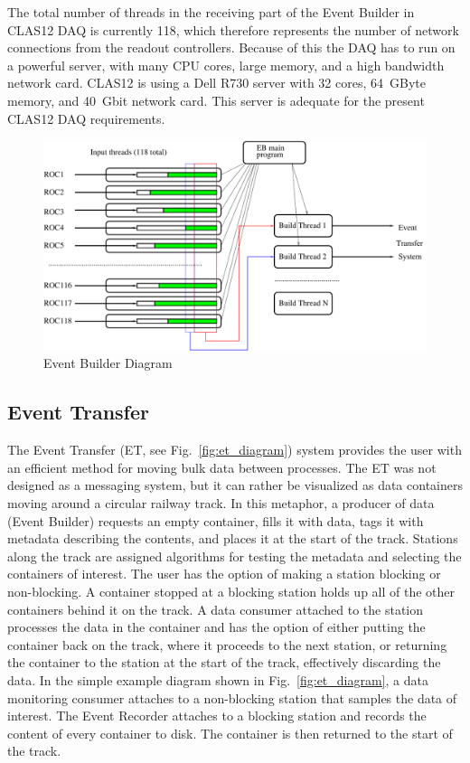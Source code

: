 The total number of threads in the receiving part of the Event Builder in CLAS12 DAQ is currently 118, which therefore represents the number of network connections from the readout controllers. Because of this the DAQ has to run on a powerful server, with many CPU cores, large memory, and a high bandwidth network card. CLAS12 is using a Dell R730 server with 32 cores, 64~GByte memory, and 40~Gbit network card. This server is adequate for the present CLAS12 DAQ requirements.

\begin{figure}[hbt]
	\centering
	\includegraphics[width=1.0\columnwidth,keepaspectratio]{img/eb_diagram.pdf}
	\caption{Event Builder Diagram}
	\label{fig:eb_diagram}
\end{figure}


\subsection{Event Transfer}

The Event Transfer (ET, see Fig.~\ref{fig:et_diagram}) system provides the user with an efficient method for moving bulk data between processes. The ET was not designed as a messaging system, but it can rather be visualized as data containers moving around a circular railway track. In this metaphor, a producer of data (Event Builder) requests an empty container, fills it with data, tags it with metadata describing the contents, and places it at the start of the track. Stations along the track are assigned algorithms for testing the metadata and selecting the containers of interest. The user has the option of making a station blocking or non-blocking. A container stopped at a blocking station holds up all of the other containers behind it on the track. A data consumer attached to the station processes the data in the container and has the option of either putting the container back on the track, where it proceeds to the next station, or returning the container to the station at the start of the track, effectively discarding the data. In the simple example diagram shown in Fig.~\ref{fig:et_diagram}, a data monitoring consumer attaches to a non-blocking station that samples the data of interest. The Event Recorder attaches to a blocking station and records the content of every container to disk. The container is then returned to the start of the track.

